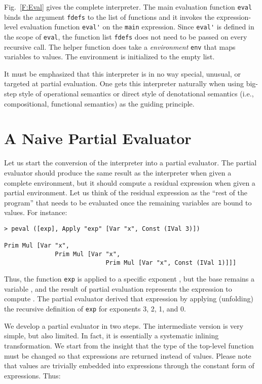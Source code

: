 \documentclass{eptcs}
\begin{document}
\noindent
Fig.~\ref{F:Eval} gives the complete interpreter.  The main evaluation
function \lstinline{eval} binds the argument \lstinline{fdefs} to the list
of functions and it invokes the expression-level evaluation function
\lstinline{eval'} on the \lstinline{main} expression. Since
\lstinline{eval'} is defined in the scope of \lstinline{eval}, the
function list \lstinline{fdefs} does not need to be passed on
every recursive call. The helper function does take a
\textit{environment} \lstinline{env} that maps variables to values. The
environment is initialized to the empty list.

It must be emphasized that this interpreter is in no way special,
unusual, or targeted at partial evaluation. One gets this interpreter
naturally when using big-step style of operational semantics or direct
style of denotational semantics (i.e., compositional, functional
semantics) as the guiding principle.


\section{A Naive Partial Evaluator}

Let us start the conversion of the interpreter into a partial
evaluator. The partial evaluator should produce the same result as the
interpreter when given a complete environment, but it should compute a
residual expression when given a partial environment. Let us think of
the residual expression as the ``rest of the program'' that needs to
be evaluated once the remaining variables are bound to values. For
instance:

\begin{lstlisting}
> peval ([exp], Apply "exp" [Var "x", Const (IVal 3)])

Prim Mul [Var "x", 
              Prim Mul [Var "x",
                            Prim Mul [Var "x", Const (IVal 1)]]]
\end{lstlisting}

\noindent
Thus, the function \lstinline{exp} is applied to a specific exponent
, but the base remains a variable , and the result of partial
evaluation represents the expression to compute . The
partial evaluator derived that expression by applying (unfolding) the
recursive definition of \lstinline{exp} for exponents 3, 2, 1, and 0.

We develop a partial evaluator in two steps. The intermediate version
is very simple, but also limited. In fact, it is essentially a
systematic inlining transformation. We start from the insight that
the type of the top-level function must be changed so that expressions
are returned instead of values. Please note that values are trivially
embedded into expressions through the constant form of
expressions. Thus:
\end{document}
